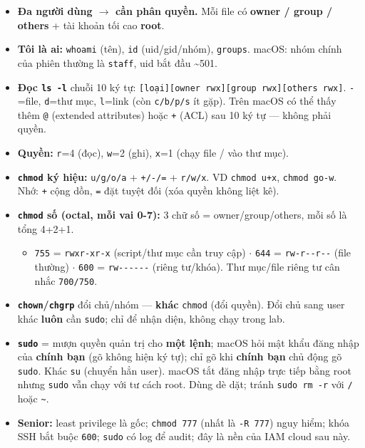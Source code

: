 \documentclass[12pt,a4paper]{article}
\newcommand{\cmd}[1]{\texttt{#1}}
\begin{document}
\begin{itemize}
\item \textbf{Đa người dùng $\rightarrow$ cần phân quyền.} Mỗi file có \textbf{owner / group /
  others} + tài khoản tối cao \textbf{root}.
\item \textbf{Tôi là ai:} \cmd{whoami} (tên), \cmd{id} (uid/gid/nhóm), \cmd{groups}.
  macOS: nhóm chính của phiên thường là \cmd{staff}, uid bắt đầu \textasciitilde 501.
\item \textbf{Đọc \cmd{ls -l}} chuỗi 10 ký tự: \cmd{[loại][owner rwx][group
  rwx][others rwx]}. \cmd{-}=file, \cmd{d}=thư mục, \cmd{l}=link (còn \cmd{c/b/p/s}
  ít gặp). Trên macOS có thể thấy thêm \cmd{@} (extended attributes) hoặc \cmd{+}
  (ACL) sau 10 ký tự --- không phải quyền.
\item \textbf{Quyền:} \cmd{r}=4 (đọc), \cmd{w}=2 (ghi), \cmd{x}=1 (chạy file / vào
  thư mục).
\item \textbf{\cmd{chmod} ký hiệu:} \cmd{u/g/o/a} + \cmd{+/-/=} + \cmd{r/w/x}. VD
  \cmd{chmod u+x}, \cmd{chmod go-w}. Nhớ: \cmd{+} cộng dồn, \cmd{=} đặt tuyệt đối
  (xóa quyền không liệt kê).
\item \textbf{\cmd{chmod} số (octal, mỗi vai 0-7):} 3 chữ số = owner/group/others,
  mỗi số là tổng 4+2+1.
  \begin{itemize}
  \item \cmd{755} = \cmd{rwxr-xr-x} (script/thư mục cần truy cập) $\cdot$
    \cmd{644} = \cmd{rw-r-{}-r-{}-} (file thường) $\cdot$
    \cmd{600} = \cmd{rw-{}-{}-{}-{}-{}-} (riêng tư/khóa). Thư mục/file riêng tư cân
    nhắc \cmd{700/750}.
  \end{itemize}
\item \textbf{\cmd{chown}/\cmd{chgrp}} đổi chủ/nhóm --- \textbf{khác} \cmd{chmod} (đổi
  quyền). Đổi chủ sang user khác \textbf{luôn} cần \cmd{sudo}; chỉ để nhận diện,
  không chạy trong lab.
\item \textbf{\cmd{sudo}} = mượn quyền quản trị cho \textbf{một lệnh}; macOS hỏi mật
  khẩu đăng nhập của \textbf{chính bạn} (gõ không hiện ký tự); chỉ gõ khi \textbf{chính
  bạn} chủ động gõ \cmd{sudo}. Khác \cmd{su} (chuyển hẳn user). macOS tắt đăng nhập
  trực tiếp bằng root nhưng \cmd{sudo} vẫn chạy với tư cách root. Dùng dè dặt; tránh
  \cmd{sudo rm -r} với \cmd{/} hoặc \cmd{\textasciitilde}.
\item \textbf{Senior:} least privilege là gốc; \cmd{chmod 777} (nhất là \cmd{-R 777})
  nguy hiểm; khóa SSH bắt buộc \cmd{600}; \cmd{sudo} có log để audit; đây là nền của
  IAM cloud sau này.
\end{itemize}
\end{document}
